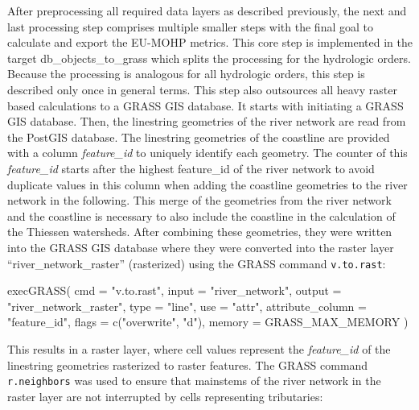 \documentclass[fleqn,10pt]{wlscirep}
\newenvironment{Shaded}{\begin{snugshade}}{\end{snugshade}}
\newcommand{\AttributeTok}[1]{\textcolor[rgb]{0.77,0.63,0.00}{#1}}
\newcommand{\FunctionTok}[1]{\textcolor[rgb]{0.00,0.00,0.00}{#1}}
\newcommand{\NormalTok}[1]{#1}
\newcommand{\StringTok}[1]{\textcolor[rgb]{0.31,0.60,0.02}{#1}}
\begin{document}
After preprocessing all required data layers as described previously, the next and last processing step comprises multiple smaller steps with the final goal to calculate and export the EU-MOHP metrics. This core step is implemented in the target db\_objects\_to\_grass which splits the processing for the hydrologic orders. Because the processing is analogous for all hydrologic orders, this step is described only once in general terms. This step also outsources all heavy raster based calculations to a GRASS GIS database. It starts with initiating a GRASS GIS database. Then, the linestring geometries of the river network are read from the PostGIS database.
The linestring geometries of the coastline are provided with a column \emph{feature\_id} to uniquely identify each geometry. The counter of this \emph{feature\_id} starts after the highest feature\_id of the river network to avoid duplicate values in this column when adding the coastline geometries to the river network in the following. This merge of the geometries from the river network and the coastline is necessary to also include the coastline in the calculation of the Thiessen watersheds.
After combining these geometries, they were written into the GRASS GIS database where they were converted into the raster layer ``river\_network\_raster'' (rasterized) using the GRASS command \texttt{v.to.rast}:

\footnotesize

\begin{Shaded}
\begin{Highlighting}[]
\FunctionTok{execGRASS}\NormalTok{(}
  \AttributeTok{cmd =} \StringTok{"v.to.rast"}\NormalTok{,}
  \AttributeTok{input =} \StringTok{"river\_network"}\NormalTok{,}
  \AttributeTok{output =} \StringTok{"river\_network\_raster"}\NormalTok{,}
  \AttributeTok{type =} \StringTok{"line"}\NormalTok{,}
  \AttributeTok{use =} \StringTok{"attr"}\NormalTok{,}
  \AttributeTok{attribute\_column =} \StringTok{"feature\_id"}\NormalTok{,}
  \AttributeTok{flags =} \FunctionTok{c}\NormalTok{(}\StringTok{"overwrite"}\NormalTok{, }\StringTok{"d"}\NormalTok{),}
  \AttributeTok{memory =}\NormalTok{ GRASS\_MAX\_MEMORY}
\NormalTok{)}
\end{Highlighting}
\end{Shaded}

\normalsize

This results in a raster layer, where cell values represent the \emph{feature\_id} of the linestring geometries rasterized to raster features.
The GRASS command \texttt{r.neighbors} was used to ensure that mainstems of the river network in the raster layer are not interrupted by cells representing tributaries:
\end{document}
